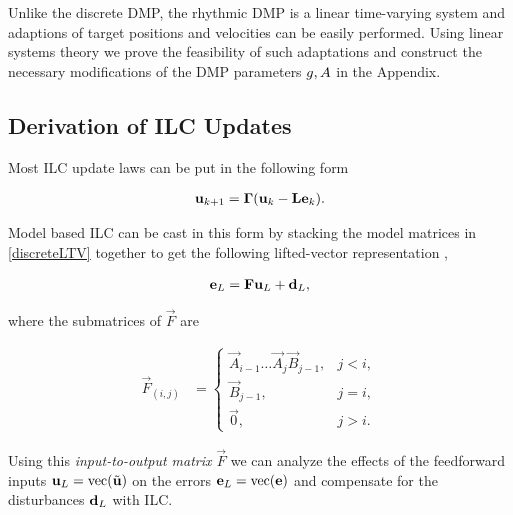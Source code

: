 Unlike the discrete DMP, the rhythmic DMP is a linear time-varying system and adaptions of target positions and velocities can be easily performed. Using linear systems theory we prove the feasibility of such adaptations and construct the necessary modifications of the DMP parameters $g,A$ in the Appendix.


\subsection{Derivation of ILC Updates}

Most ILC update laws can be put in the following form

\begin{equation}
\begin{aligned}
\boldsymbol{\mathrm{u}}_{k+1} = \boldsymbol{\mathrm{\Gamma}}(\boldsymbol{\mathrm{u}}_{k} - \boldsymbol{\mathrm{L}}\boldsymbol{\mathrm{e}}_{k}).
\end{aligned}
\label{ILCupdateForm}
\end{equation}

\noindent Model based ILC can be cast in this form by stacking the model matrices in \eqref{discreteLTV} together to get the following lifted-vector representation \cite{Bristow06}, \cite{Schoellig12}

\begin{equation}
\begin{aligned}
\boldsymbol{\mathrm{e}}_L &= \boldsymbol{\mathrm{F}}\boldsymbol{\mathrm{u}}_L + \boldsymbol{\mathrm{d}}_L, \\
\end{aligned}
\label{liftedLTV}
\end{equation}

\noindent where the submatrices of $\vec{F}$ are

\begin{equation}
\begin{aligned}
\vec{F}_{(i,j)} &= \left \{
\begin{array}{cc}
\vec{A}_{i-1}\ldots \vec{A}_j \vec{B}_{j-1}, & j < i, \\ 
\vec{B}_{j-1}, & j = i, \\
\vec{0}, & j > i. 
\end{array} \right.
\end{aligned}
\label{Fmatrix}
\end{equation}

\noindent Using this \emph{input-to-output matrix} $\vec{F}$ we can analyze the effects of the feedforward inputs $\boldsymbol{\mathrm{u}}_L = \operatorname{vec}(\tilde{\boldsymbol{\mathrm{u}}})$ on the errors $\boldsymbol{\mathrm{e}}_L = \operatorname{vec}(\boldsymbol{\mathrm{e}})$ and compensate for the disturbances $\boldsymbol{\mathrm{d}}_L$ with ILC.

